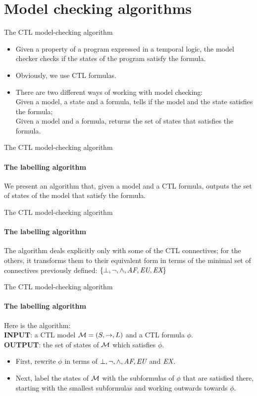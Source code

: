 \section{Model checking algorithms}

\begin{frame}{The CTL model-checking algorithm}
	\begin{itemize}
		\item
		{
			Given a property of a program expressed in a temporal logic, the model checker checks if the states of the program satisfy the formula.
			\pause
		}
		\item
		{
			Obviously, we use CTL formulas.
			\pause
		}
		\item
		{
			There are two different ways of working with model checking:\\
			\pause
			Given a model, a state and a formula, tells if the model and the state satisfies the formula;\\
			\pause
			Given a model and a formula, returns the set of states that satisfies the formula.
		}
	\end{itemize}
\end{frame}

\begin{frame}{The CTL model-checking algorithm}
	\framesubtitle{The labelling algorithm}
	We present an algorithm that, given a model and a CTL formula, outputs the set of states of the model that satisfy the formula. 
\end{frame}

\begin{frame}{The CTL model-checking algorithm}
	\framesubtitle{The labelling algorithm}
	The algorithm deals explicitly only with some of the CTL connectives; for the others, it transforms them to their equivalent form in terms of the minimal set of connectives previously defined: $\{\bot, \neg, \land, \textit{A}\textit{F}, \textit{E}\textit{U}, \textit{E}\textit{X} \}$ 
\end{frame}

\begin{frame}{The CTL model-checking algorithm}
	\framesubtitle{The labelling algorithm}
	Here is the algorithm:\\
	\pause
	{\bf INPUT}: a CTL model $\mathcal{M} = (S, \to, L)$ and a CTL formula $\phi$.\\
	{\bf OUTPUT}: the set of states of $\mathcal{M}$ which satisfies $\phi$.\\
	\pause
	\begin{itemize}
		\item
		{
			First, rewrite $\phi$ in terms of $\bot, \neg, \land, \textit{A}\textit{F}, \textit{E}\textit{U}$ and $\textit{E}\textit{X}$.
			\pause
		}
		\item
		{
			Next, label the states of $\mathcal{M}$ with the subformulas of $\phi$ that are satisfied there, starting with the smallest subformulas and working outwards towards $\phi$.
		}
	\end{itemize}
\end{frame}

